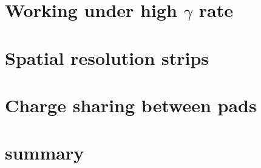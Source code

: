 \section{Working under high $\gamma$ rate}

\section{Spatial resolution strips}

\section{Charge sharing between pads}

\section{summary}

